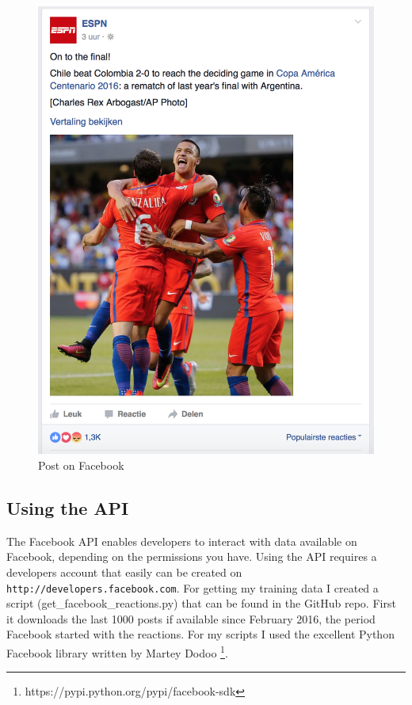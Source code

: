 \documentclass[11pt]{article}
\begin{document}
\begin{figure}
  \includegraphics[width=\linewidth]{facebook_post_football.png}
  \caption{Post on Facebook}
  \label{fig:facebook_reactions_post_football}
\end{figure}

\subsection{Using the API}
The Facebook API enables developers to interact with data available on Facebook, depending on the permissions you have. Using the API requires a developers account that easily can be created on \verb+http://developers.facebook.com+. For getting my training data I created a script (get\_facebook\_reactions.py) that can be found in the GitHub repo. First it downloads the last 1000 posts if available since February 2016, the period Facebook started with the reactions. For my scripts I used the excellent Python Facebook library written by Martey Dodoo \footnote{https://pypi.python.org/pypi/facebook-sdk}. 
\end{document}
